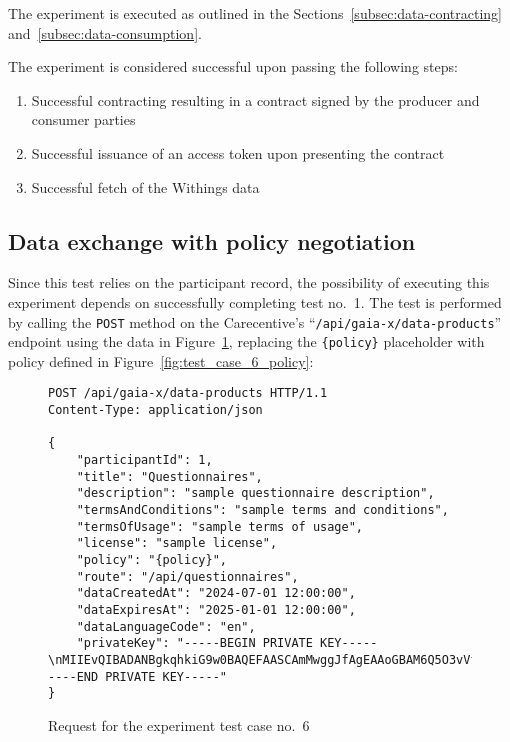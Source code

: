 The experiment is executed as outlined in the Sections~\ref{subsec:data-contracting} and~\ref{subsec:data-consumption}.

The experiment is considered successful upon passing the following steps:
\begin{enumerate}
    \item Successful contracting resulting in a contract signed by the producer and consumer parties
    \item Successful issuance of an access token upon presenting the contract
    \item Successful fetch of the Withings data
\end{enumerate}

\subsection{Data exchange with policy negotiation}\label{subsec:data-exchange-with-policy-negotiation}

Since this test relies on the participant record, the possibility of executing this experiment depends on successfully completing test no.~1.
The test is performed by calling the \texttt{POST} method on the Carecentive's ``\texttt{/api/gaia-x/data-products}'' endpoint using the data in Figure~\ref{fig:test_case_6}, replacing the \texttt{\{policy\}} placeholder with policy defined in Figure~\ref{fig:test_case_6_policy}:

\begin{figure}[h]
    \centering
    \begin{verbatim}
POST /api/gaia-x/data-products HTTP/1.1
Content-Type: application/json

{
    "participantId": 1,
	"title": "Questionnaires",
	"description": "sample questionnaire description",
	"termsAndConditions": "sample terms and conditions",
	"termsOfUsage": "sample terms of usage",
	"license": "sample license",
	"policy": "{policy}",
	"route": "/api/questionnaires",
	"dataCreatedAt": "2024-07-01 12:00:00",
	"dataExpiresAt": "2025-01-01 12:00:00",
	"dataLanguageCode": "en",
	"privateKey": "-----BEGIN PRIVATE KEY-----\nMIIEvQIBADANBgkqhkiG9w0BAQEFAASCAmMwggJfAgEAAoGBAM6Q5O3vVfnxk6P7\n...\nYWw+HiFJh9XQpRUtv9PV8L8AqFFfMdsOpT6pgC+aA/WB\n-----END PRIVATE KEY-----"
}
    \end{verbatim}
    \caption{Request for the experiment test case no.~6}\label{fig:test_case_6}
\end{figure}

